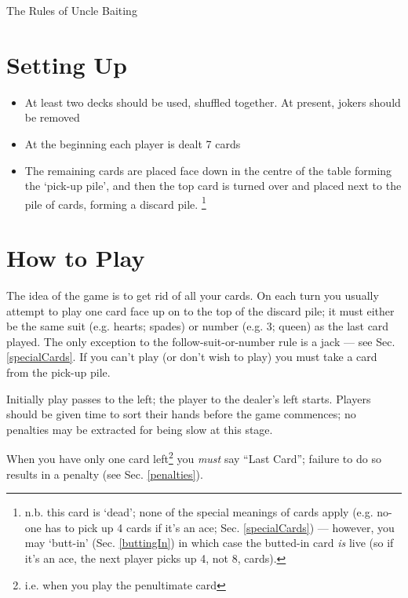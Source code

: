 \documentclass[12pt]{article}
\newcommand{\Sec}[1]{Sec. \ref{#1}}
\begin{document}
\begin{center}
  \Large The Rules of Uncle Baiting
\end{center}


\section{Setting Up}

\begin{itemize}
\item At least two decks should be used, shuffled together.  At present, jokers should be removed
  
\item At the beginning each player is dealt 7 cards
  
\item The remaining cards are placed face down in the centre of the table forming the `pick-up pile', and then the
  top card is turned over and placed next to the pile of cards, forming a discard pile.%
\footnote{n.b. this card is `dead'; none of the special meanings of cards apply (e.g.
no-one has to pick up 4 cards if it's an ace; \Sec{specialCards}) --- however, you 
may `butt-in' (\Sec{buttingIn}) in which case the butted-in card \textit{is}
live (so if it's an ace, the next player picks up 4, not 8, cards).}

\end{itemize}

\section{How to Play}

The idea of the game is to get rid of all your cards.  On each turn you usually attempt to play one card face up on to
the top of the discard pile; it must either be the same suit (e.g. hearts; spades) or number (e.g.  3; queen) as the
last card played.  The only exception to the follow-suit-or-number rule is a jack --- see \Sec{specialCards}.  If you
can't play (or don't wish to play) you must take a card from the pick-up pile.

Initially play passes to the left; the player to the dealer's left starts.
Players should be given time to sort their hands before the game commences; no
penalties may be extracted for being slow at this stage.

When you have only one card left\footnote{i.e. when you play the penultimate card}
you \emph{must} say ``Last Card'';  failure to do
so results in a penalty (see \Sec{penalties}).
\end{document}
